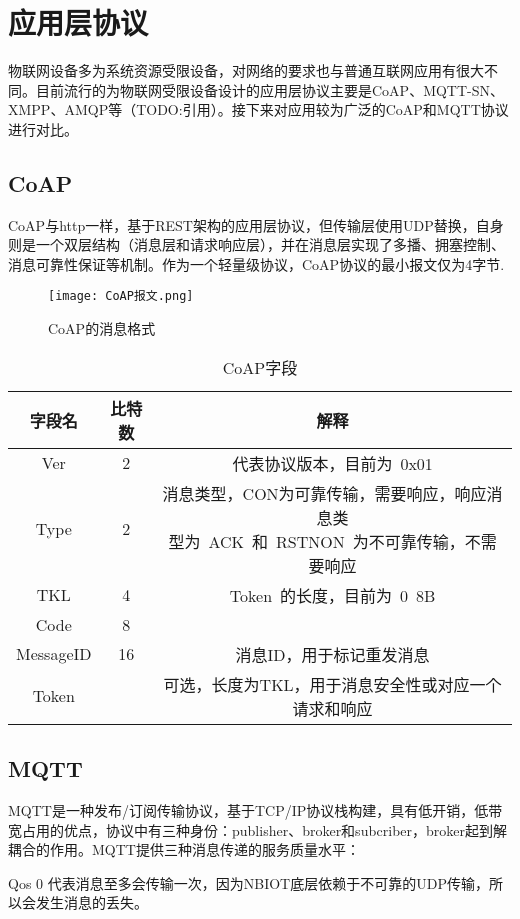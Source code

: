 \section{应用层协议}

物联网设备多为系统资源受限设备，对网络的要求也与普通互联网应用有很大不同。目前流行的为物联网受限设备设计的应用层协议主要是CoAP、MQTT-SN、XMPP、AMQP等（TODO:引用）。接下来对应用较为广泛的CoAP和MQTT协议进行对比。

\subsection{CoAP}
CoAP与http一样，基于REST架构的应用层协议，但传输层使用UDP替换，自身则是一个双层结构（消息层和请求响应层），并在消息层实现了多播、拥塞控制、消息可靠性保证等机制。作为一个轻量级协议，CoAP协议的最小报文仅为4字节.

\begin{figure}[h]
	\texttt{[image: CoAP报文.png]}
	\caption{CoAP的消息格式}
	\label{CoAP报文}
\end{figure}

  
\begin{table}[h!]
\caption{CoAP字段}
\begin{tabular}{ccc}
\toprule
字段名 & 比特数 & 解释\\
\midrule
Ver&2&代表协议版本，目前为 0x01 \\
Type&2&\makecell[c]{消息类型，CON为可靠传输，需要响应，响应消息类\\型为 ACK 和 RSTNON 为不可靠传输，不需要响应}\\
TKL&4&Token 的长度，目前为 0~8B \\ 
Code&8&	\\
MessageID&16&消息ID，用于标记重发消息\\
Token&&可选，长度为TKL，用于消息安全性或对应一个请求和响应\\
\bottomrule
\end{tabular}
\label{coap字段}
\end{table}


\subsection{MQTT}

MQTT是一种发布/订阅传输协议，基于TCP/IP协议栈构建，具有低开销，低带宽占用的优点，协议中有三种身份：publisher、broker和subcriber，broker起到解耦合的作用。MQTT提供三种消息传递的服务质量水平：

Qos 0 代表消息至多会传输一次，因为NBIOT底层依赖于不可靠的UDP传输，所以会发生消息的丢失。

